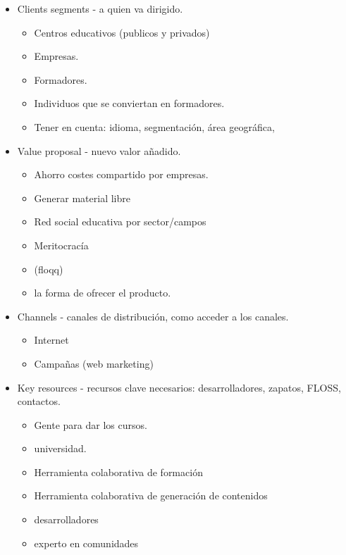\documentclass[11pt]{scrartcl}
\begin{document}
\begin{itemize}
    \item Clients segments - a quien va dirigido.
    
    \begin{itemize}
        \item Centros educativos (publicos y privados)
        \item Empresas.
        \item Formadores.
        \item Individuos que se conviertan en formadores.
        \item Tener en cuenta: idioma, segmentación, área geográfica,
    \end{itemize}
    
    \item Value proposal - nuevo valor añadido.
    
    \begin{itemize}
        \item Ahorro costes compartido por empresas.
        \item Generar material libre
        \item Red social educativa por sector/campos
        \item Meritocracía
        \item (floqq)
        \item la forma de ofrecer el producto.
    \end{itemize}
    
    \item Channels - canales de distribución, como acceder a los canales.
    
    \begin{itemize}
        \item Internet
        \item Campañas (web marketing)
    \end{itemize}
    
    \item Key resources - recursos clave necesarios: desarrolladores,
    zapatos, FLOSS, contactos.
    
    \begin{itemize}
        \item Gente para dar los cursos.
        \item universidad.
        \item Herramienta colaborativa de formación
        \item Herramienta colaborativa de generación de contenidos
        \item desarrolladores
        \item experto en comunidades
    \end{itemize}
    

\end{itemize}
\end{document}
